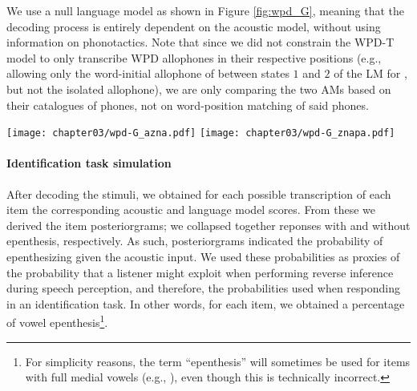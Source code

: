 {We use a null language model as shown in Figure \ref{fig:wpd_G}, meaning that the decoding process is entirely dependent on the acoustic model, without using information on phonotactics. Note that since we did not constrain the WPD-T model to only transcribe WPD allophones in their respective positions (e.g., allowing only the word-initial allophone of  between states $1$ and $2$ of the LM for , but not the isolated  allophone), we are only comparing the two AMs based on their catalogues of phones, not on word-position matching of said phones.   

\begin{figure*}[htb]
\centering
\texttt{[image: chapter03/wpd-G\_azna.pdf]}
\vspace{0.5cm}
\texttt{[image: chapter03/wpd-G\_znapa.pdf]}
\caption{Constrained language model used for stimulus decoding (here: LMs for  (top) and  (bottom) trials). Nodes in the graph represent states, edges represent transitions between states (here: phonemes, transcribed in WSJ notation). Models were given the choice to transcribe the phoneme  with any of the phonemes linked to the grapheme $\langle a \rangle$, as English listeners might have also done so during the task. The LMs are null, as they only constrain the possible decoding outputs without assigning higher or lower probabilities to certain edges. The optimal decoding path is therefore only dependent on the acoustic scores.}
\label{fig:wpd_G}
\end{figure*}

\paragraph{Identification task simulation}
After decoding the stimuli, we obtained for each possible transcription of each item the corresponding acoustic and language model scores. From these we derived the item posteriorgrams; we collapsed together reponses with and without epenthesis, respectively. As such, posteriorgrams indicated the probability of epenthesizing \textipa{[@]} given the acoustic input. We used these probabilities as proxies of the probability that a listener might exploit when performing reverse inference during speech perception, and therefore, the probabilities used when responding in an identification task. In other words, for each item, we obtained a percentage of vowel epenthesis\footnote{For simplicity reasons, the term ``epenthesis'' will sometimes be used for items with full medial vowels (e.g., ), even though this is technically incorrect.}.

}
